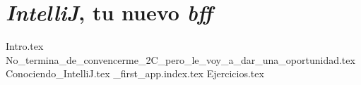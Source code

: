\chapter{\textit{IntelliJ}, tu nuevo \textit{bff}}
  {Intro.tex}
  {No_termina_de_convencerme_2C_pero_le_voy_a_dar_una_oportunidad.tex}
  {Conociendo_IntelliJ.tex}
  {_first_app.index.tex}
  {Ejercicios.tex}
  \nocite{*}
  \printbibliography[keyword=intellij]